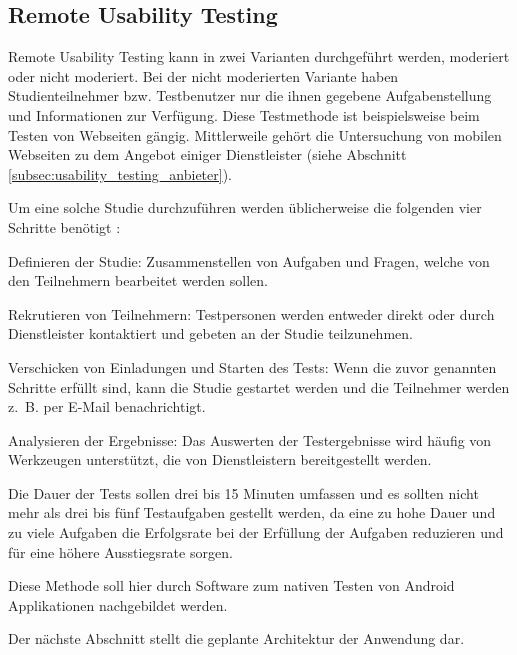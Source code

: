 \subsection{Remote Usability Testing}\label{subsec:remote_usability_testing}
Remote Usability Testing kann in zwei Varianten durchgeführt werden, moderiert oder nicht moderiert.
Bei der nicht moderierten Variante haben Studienteilnehmer bzw. Testbenutzer nur die ihnen gegebene Aufgabenstellung und Informationen zur Verfügung.
Diese Testmethode ist beispielsweise beim Testen von Webseiten gängig.
Mittlerweile gehört die Untersuchung von mobilen Webseiten zu dem Angebot einiger Dienstleister (siehe Abschnitt \ref{subsec:usability_testing_anbieter}).

Um eine solche Studie durchzuführen werden üblicherweise die folgenden vier Schritte benötigt \cite[Vgl.][]{Sourcy.2010}:
\begin{compactdesc}
	\item[Definieren der Studie:] 
	Zusammenstellen von Aufgaben und Fragen, welche von den Teilnehmern bearbeitet werden sollen.
	\item[Rekrutieren von Teilnehmern:] 
	Testpersonen werden entweder direkt oder durch Dienstleister kontaktiert und gebeten an der Studie teilzunehmen.
	\item[Verschicken von Einladungen und Starten des Tests:] 
	Wenn die zuvor genannten Schritte erfüllt sind, kann die Studie gestartet werden und die Teilnehmer werden z.~B. per E-Mail benachrichtigt.
	\item[Analysieren der Ergebnisse:] Das Auswerten der Testergebnisse wird häufig von Werkzeugen unterstützt, die von Dienstleistern bereitgestellt werden.
\end{compactdesc}
Die Dauer der Tests sollen drei bis 15 Minuten umfassen und es sollten nicht mehr als drei bis fünf Testaufgaben gestellt werden, da eine zu hohe Dauer und zu viele Aufgaben die Erfolgsrate bei der Erfüllung der Aufgaben reduzieren und für eine höhere Ausstiegsrate sorgen.\cite[Vgl.][]{Sourcy.2010}

Diese Methode soll hier durch Software zum nativen Testen von Android Applikationen nachgebildet werden.

Der nächste Abschnitt stellt die geplante Architektur der Anwendung dar.